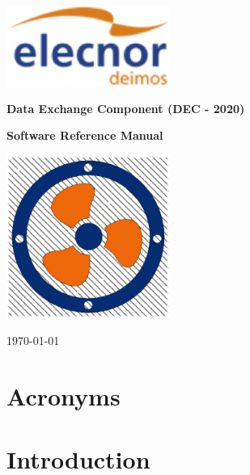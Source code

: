 \documentclass[
	oneside,
	openany,
	a4paper,
	headings=optiontoheadandtoc
	]{book}
\begin{document}

\begin{titlepage}
	\begin{center}
		
		\includegraphics[width=0.4\textwidth]{logo_elecnor_deimos.png}
		
		\vspace*{1cm}
		\Large
		\textbf{Data Exchange Component (DEC - 2020)}
		
		\textbf{Software Reference Manual}
		
		\vspace*{1cm}
		
		\includegraphics[width=0.4\textwidth]{DEC_Logo_White.png}
		
		\vspace{0.8cm}
		
		\today
		
	\end{center}
\end{titlepage}
	


\tableofcontents
\newpage

\chapter{Acronyms}
 
\newpage
 
\chapter{Introduction}

\newpage
\end{document}
